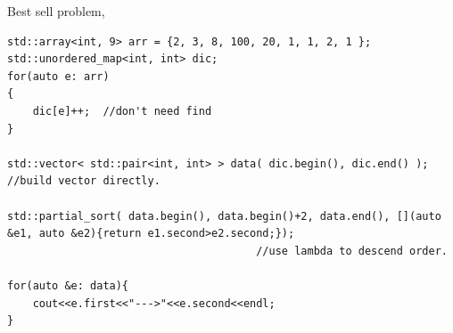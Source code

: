 \documentclass[a4paper,11pt,twoside]{book}
\begin{document}
	
%
%
%	
%	
%		
%			
%
%

\par Best sell problem, 

\begin{lstlisting}
std::array<int, 9> arr = {2, 3, 8, 100, 20, 1, 1, 2, 1 };
std::unordered_map<int, int> dic;
for(auto e: arr)
{
	dic[e]++;  //don't need find
}

std::vector< std::pair<int, int> > data( dic.begin(), dic.end() );  //build vector directly.

std::partial_sort( data.begin(), data.begin()+2, data.end(), [](auto &e1, auto &e2){return e1.second>e2.second;}); 
                                       //use lambda to descend order. 

for(auto &e: data){
	cout<<e.first<<"--->"<<e.second<<endl;
}	
\end{lstlisting}
\end{document}
